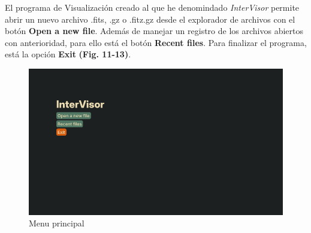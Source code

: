 \documentclass[9pt,twocolumn,a4paper]{opticajnl}
\begin{document}
El programa de Visualización creado al que he denomindado \textit{InterVisor} permite abrir un nuevo archivo .fits, .gz o .fitz.gz desde el explorador de archivos con el botón \textbf{Open a new file}. Además de manejar un registro de los archivos abiertos con anterioridad, para ello está el botón \textbf{Recent files}. Para finalizar el programa, está la opción \textbf{Exit} \textbf{(Fig. 11-13)}.

\begin{figure}
    \centering
    \includegraphics[width=1\linewidth]{menuprincipal1.png}
    \caption{Menu principal}
    \label{fig:menuprincipal1}
\end{figure}
\end{document}
